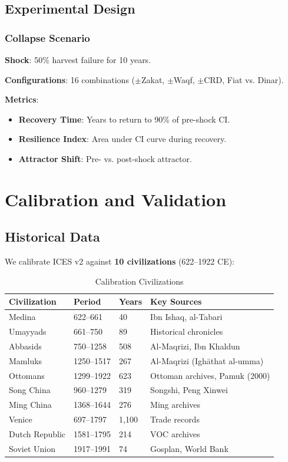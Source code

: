 \documentclass[12pt,a4paper]{article}
\begin{document}
\subsection{Experimental Design}

\subsubsection{Collapse Scenario}

\textbf{Shock}: 50\% harvest failure for 10 years.

\textbf{Configurations}: 16 combinations ($\pm$Zakat, $\pm$Waqf, $\pm$CRD, Fiat vs. Dinar).

\textbf{Metrics}:
\begin{itemize}
    \item \textbf{Recovery Time}: Years to return to 90\% of pre-shock CI.
    \item \textbf{Resilience Index}: Area under CI curve during recovery.
    \item \textbf{Attractor Shift}: Pre- vs. post-shock attractor.
\end{itemize}

\section{Calibration and Validation}

\subsection{Historical Data}

We calibrate ICES v2 against \textbf{10 civilizations} (622--1922 CE):

\begin{table}[H]
\centering
\caption{Calibration Civilizations}
\label{tab:civilizations}
\begin{tabular}{p{3cm} p{3cm} p{2cm} p{5cm}}
\toprule
\textbf{Civilization} & \textbf{Period} & \textbf{Years} & \textbf{Key Sources} \\
\midrule
Medina & 622--661 & 40 & Ibn Ishaq, al-Tabari \\
Umayyads & 661--750 & 89 & Historical chronicles \\
Abbasids & 750--1258 & 508 & Al-Maqrizi, Ibn Khaldun \\
Mamluks & 1250--1517 & 267 & Al-Maqrizi (Ighāthat al-umma) \\
Ottomans & 1299--1922 & 623 & Ottoman archives, Pamuk (2000) \\
Song China & 960--1279 & 319 & Songshi, Peng Xinwei \\
Ming China & 1368--1644 & 276 & Ming archives \\
Venice & 697--1797 & 1,100 & Trade records \\
Dutch Republic & 1581--1795 & 214 & VOC archives \\
Soviet Union & 1917--1991 & 74 & Gosplan, World Bank \\
\bottomrule
\end{tabular}
\end{table}
\end{document}
